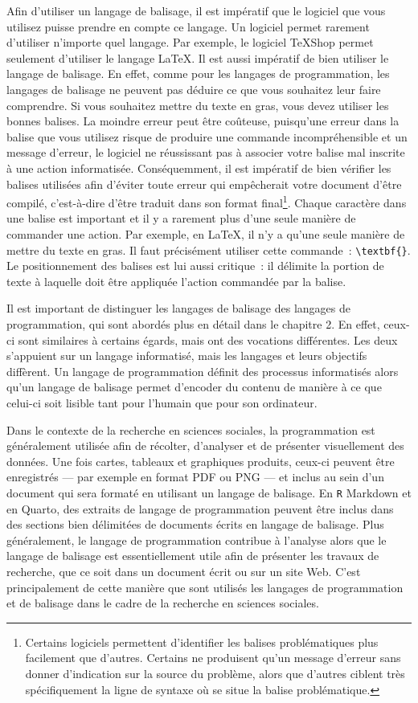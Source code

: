 \documentclass[
  letterpaper,
  DIV=11,
  numbers=noendperiod]{scrreprt}
\begin{document}
Afin d'utiliser un langage de balisage, il est impératif que le logiciel
que vous utilisez puisse prendre en compte ce langage. Un logiciel
permet rarement d'utiliser n'importe quel langage. Par exemple, le
logiciel \TeX{}Shop permet seulement d'utiliser le langage \LaTeX. Il
est aussi impératif de bien utiliser le langage de balisage. En effet,
comme pour les langages de programmation, les langages de balisage ne
peuvent pas déduire ce que vous souhaitez leur faire comprendre. Si vous
souhaitez mettre du texte en gras, vous devez utiliser les bonnes
balises. La moindre erreur peut être coûteuse, puisqu'une erreur dans la
balise que vous utilisez risque de produire une commande
incompréhensible et un message d'erreur, le logiciel ne réussissant pas
à associer votre balise mal inscrite à une action informatisée.
Conséquemment, il est impératif de bien vérifier les balises utilisées
afin d'éviter toute erreur qui empêcherait votre document d'être
compilé, c'est-à-dire d'être traduit dans son format final\footnote{Certains
  logiciels permettent d'identifier les balises problématiques plus
  facilement que d'autres. Certains ne produisent qu'un message d'erreur
  sans donner d'indication sur la source du problème, alors que d'autres
  ciblent très spécifiquement la ligne de syntaxe où se situe la balise
  problématique.}. Chaque caractère dans une balise est important et il
y a rarement plus d'une seule manière de commander une action. Par
exemple, en \LaTeX, il n'y a qu'une seule manière de mettre du texte en
gras. Il faut précisément utiliser cette commande~:
\texttt{\textbackslash{}textbf\{\}}. Le positionnement des balises est
lui aussi critique~: il délimite la portion de texte à laquelle doit
être appliquée l'action commandée par la balise.

Il est important de distinguer les langages de balisage des langages de
programmation, qui sont abordés plus en détail dans le chapitre 2. En
effet, ceux-ci sont similaires à certains égards, mais ont des vocations
différentes. Les deux s'appuient sur un langage informatisé, mais les
langages et leurs objectifs diffèrent. Un langage de programmation
définit des processus informatisés alors qu'un langage de balisage
permet d'encoder du contenu de manière à ce que celui-ci soit lisible
tant pour l'humain que pour son ordinateur.

Dans le contexte de la recherche en sciences sociales, la programmation
est généralement utilisée afin de récolter, d'analyser et de présenter
visuellement des données. Une fois cartes, tableaux et graphiques
produits, ceux-ci peuvent être enregistrés --- par exemple en format PDF
ou PNG --- et inclus au sein d'un document qui sera formaté en utilisant
un langage de balisage. En \texttt{R} Markdown et en Quarto, des
extraits de langage de programmation peuvent être inclus dans des
sections bien délimitées de documents écrits en langage de balisage.
Plus généralement, le langage de programmation contribue à l'analyse
alors que le langage de balisage est essentiellement utile afin de
présenter les travaux de recherche, que ce soit dans un document écrit
ou sur un site Web. C'est principalement de cette manière que sont
utilisés les langages de programmation et de balisage dans le cadre de
la recherche en sciences sociales.
\end{document}
